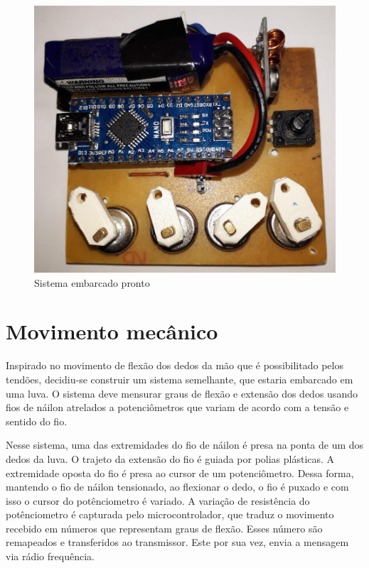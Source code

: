 \documentclass[
	12pt,				%
	openright,			%
	oneside,			%
	a4paper,			%
	english,			%
	brazil				%
	]{abntex2}
\begin{document}
		\begin{figure}[h!]
			\centering
  		\includegraphics[scale=0.3]{./figures/glove-module-ready1.jpg}
			\caption{Sistema embarcado pronto}
  		\label{Fig:glove-module-ready1}
		\end{figure}
		
		
		\section{Movimento mecânico}

		Inspirado no movimento de flexão dos dedos da mão que é possibilitado pelos tendões, decidiu-se construir um sistema semelhante, que estaria embarcado em uma luva. O sistema deve mensurar graus de flexão e extensão dos dedos usando fios de náilon atrelados a potenciômetros que variam de acordo com a tensão e sentido do fio.

		Nesse sistema, uma das extremidades do fio de náilon é presa na ponta de um dos dedos da luva. O trajeto da extensão do fio é guiada por polias plásticas. A extremidade oposta do fio é presa ao cursor de um potenciômetro.
		Dessa forma, mantendo o fio de náilon tensionado, ao flexionar o dedo, o fio é puxado e com isso o cursor do potênciometro é variado.
		A variação de resistência do potênciometro é capturada pelo microcontrolador, que traduz o movimento recebido em números que representam graus de flexão. Esses número são remapeados e transferidos ao transmissor. Este por sua vez, envia a mensagem via rádio frequência.
\end{document}
